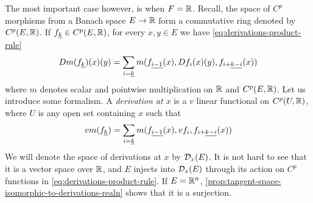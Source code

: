 \documentclass[../main-manifolds.tex]{subfiles}
\begin{document}
The most important case however, is when $F = \mathbb{R}$. Recall, the space of $C^p$ morphisms from a Banach space $E\to \mathbb{R}$ form a commutative ring denoted by $C^p(E,\mathbb{R})$. If $\UL{f}[k]\in C^p(E,\real)$, for every $x,y\in E$ we have \cref{eq:derivations-product-rule}
\begin{equation}\label{eq:derivations-product-rule}
    Dm(\UL{f}[k])(x)(y) = \sum_{i=\underline{k}}m(\UL{f}[i-1](x),Df_i(x)(y),\UL{f}[i+][k-i](x))
\end{equation}
where $m$ denotes scalar and pointwise multiplication on $\mathbb{R}$ and $C^p(E,\mathbb{R})$. Let us introduce some formalism. A \emph{derivation at $x$} is a $v$ linear functional on $C^p(U,\mathbb{R})$, where $U$ is any open set containing $x$ such that
\begin{equation}\label{eq:derivations-product-rule-abstract}
    vm(\UL{f}[k]) = \sum_{i=\underline{k}}m(\UL{f}[i-1](x), vf_i,\UL{f}[i+][k-i](x))
\end{equation}
We will denote the space of derivations at $x$ by $\mathcal{D}_x(E)$. It is not hard to see that it is a vector space over $\mathbb{R}$, and $E$ injects into $\mathcal{D}_x(E)$ through its action on $C^p$ functions in \cref{eq:derivations-product-rule}. If $E = {\mathbb{R}^n}$, \cref{prop:tangent-space-isomorphic-to-derivations-realn} shows that it is a surjection.
\begin{wts}\label{prop:tangent-space-isomorphic-to-derivations-realn}
    
\end{wts}





\end{document}
